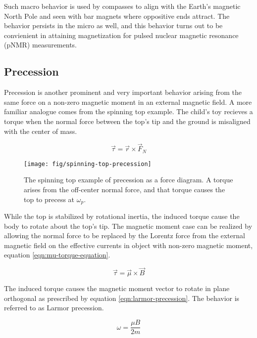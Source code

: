 \noindent 
Such macro behavior is used by compasses to align with the Earth's magnetic North Pole and seen with bar magnets where oppositive ends attract.  The behavior persists in the micro as well, and this behavior turns out to be convienient in attaining magnetization for pulsed nuclear magnetic resonance (pNMR) measurements.

\subsection{Precession}
Precession is another prominent and very important behavior arising from the same force on a non-zero magnetic moment in an external magnetic field.  A more familiar analogue comes from the spinning top example.  The child's toy recieves a torque when the normal force between the top's tip and the ground is misaligned with the center of mass. 

\begin{equation}
\label{eqn:top-torque-equation}
\vec{\tau} = \vec{r} \times \vec{F}_{N}
\end{equation}

\begin{figure}
\label{fig:spinning-top-precession}
\centering
\texttt{[image: fig/spinning-top-precession]}
\caption{The spinning top example of precession as a force diagram.  A torque arises from the off-center normal force, and that torque causes the top to precess at $\omega_p$.  }
\end{figure}

\noindent
While the top is stabilized by rotational inertia, the induced torque cause the body to rotate about the top's tip.  The magnetic moment case can be realized by allowing the normal force to be replaced by the Lorentz force from the external magnetic field on the effective currents in object with non-zero magnetic moment, equation \ref{eqn:mu-torque-equation}.

\begin{equation}
\label{eqn:mu-torque-equation}
\vec{\tau} = \vec{\mu} \times \vec{B}
\end{equation}

\noindent
The induced torque causes the magnetic moment vector to rotate in plane orthogonal as prescribed by equation \ref{eqn:larmor-precession}. The behavior is referred to as Larmor precession.

\begin{equation}
\label{eqn:larmor-precession}
\omega = \frac{\mu B}{2 m}
\end{equation}

